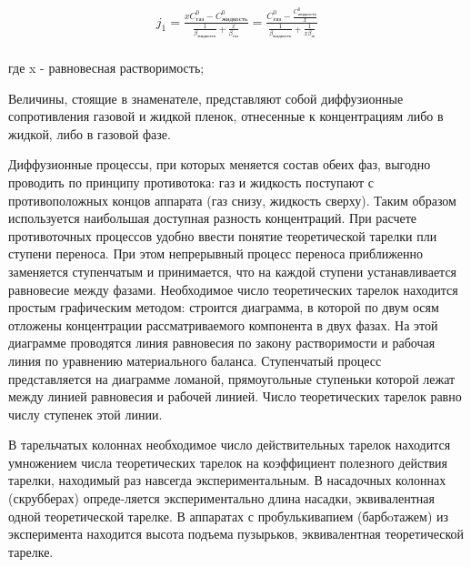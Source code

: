 \begin{equation}
	\label{eq:equation1}
	\begin{alignedat}{2}
		j_1 = \frac{xC^0_\text{газ} - C^0_\text{жидкость}}{\frac{1}{\beta_\text{жидкость}} + \frac{x}{\beta_\text{газ}}} = \frac{C^0_\text{газ} - \frac{C^0_\text{жидкость}}{x}}{{\frac{1}{\beta_\text{жидкость}} + \frac{1}{x\beta_\text{ж}}}}
	\end{alignedat}
\end{equation}\\
где x - равновесная растворимость;

Величины, стоящие в знаменателе, представляют собой диффузионные сопротивления газовой и жидкой пленок, отнесенные к концентрациям либо в жидкой, либо в газовой фазе.

Диффузионные процессы, при которых меняется состав обеих фаз, выгодно проводить по принципу противотока: газ и жидкость поступают с противоположных концов аппарата (газ снизу, жидкость сверху). Таким образом используется наибольшая доступная разность концентраций. При расчете противоточных процессов удобно ввести понятие теоретической тарелки пли ступени переноса. При этом непрерывный процесс переноса приближенно заменяется ступенчатым и принимается, что на каждой ступени устанавливается равновесие между фазами. Необходимое число теоретических тарелок находится простым графическим методом: строится диаграмма, в которой по двум осям отложены концентрации рассматриваемого компонента в двух фазах. На этой диаграмме проводятся линия равновесия по закону растворимости и рабочая линия по уравнению материального баланса. Ступенчатый процесс представляется на диаграмме ломаной, прямоугольные ступеньки которой лежат между линией равновесия и рабочей линией. Число теоретических тарелок равно числу ступенек этой линии. 

В тарельчатых колоннах необходимое число действительных тарелок находится умножением числа теоретических тарелок на коэффициент полезного действия тарелки, находимый раз навсегда экспериментальным. В насадочных колоннах (скрубберах) опреде-ляется экспериментально длина насадки, эквивалентная одной теоретической тарелке. В аппаратах с пробулькивапием (барбoтажем) из эксперимента находится высота подъема пузырьков, эквивалентная теоретической тарелке. 

